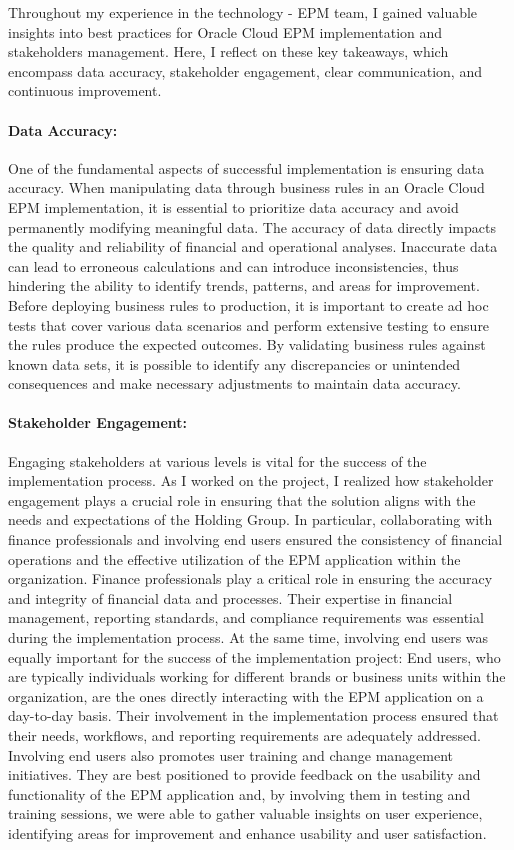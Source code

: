\documentclass[12pt,a4paper,openright,twoside]{book}
\begin{document}
Throughout my experience in the technology - EPM team, I gained valuable insights into best practices for Oracle Cloud EPM implementation and stakeholders management.
%
Here, I reflect on these key takeaways, which encompass data accuracy, stakeholder engagement, clear communication, and continuous improvement.

\paragraph{Data Accuracy:}
One of the fundamental aspects of successful implementation is ensuring data accuracy. 
%
When manipulating data through business rules in an Oracle Cloud EPM implementation, it is essential to prioritize data accuracy and avoid permanently modifying meaningful data. 
%
The accuracy of data directly impacts the quality and reliability of financial and operational analyses. 
%
Inaccurate data can lead to erroneous calculations and can introduce inconsistencies, thus hindering the ability to identify trends, patterns, and areas for improvement.
%
Before deploying business rules to production, it is important to create ad hoc tests that cover various data scenarios and perform extensive testing to ensure the rules produce the expected outcomes. 
%
By validating business rules against known data sets, it is possible to identify any discrepancies or unintended consequences and make necessary adjustments to maintain data accuracy.

\paragraph{Stakeholder Engagement:}
Engaging stakeholders at various levels is vital for the success of the implementation process. 
%
As I worked on the project, I realized how stakeholder engagement plays a crucial role in ensuring that the solution aligns with the needs and expectations of the Holding Group.
%
In particular, collaborating with finance professionals and involving end users ensured the consistency of financial operations and the effective utilization of the EPM application within the organization.
%
Finance professionals play a critical role in ensuring the accuracy and integrity of financial data and processes. 
%
Their expertise in financial management, reporting standards, and compliance requirements was essential during the implementation process.
%
At the same time, involving end users was equally important for the success of the implementation project:
%
End users, who are typically individuals working for different brands or business units within the organization, are the ones directly interacting with the EPM application on a day-to-day basis. 
%
Their involvement in the implementation process ensured that their needs, workflows, and reporting requirements are adequately addressed.
%
Involving end users also promotes user training and change management initiatives. 
%
They are best positioned to provide feedback on the usability and functionality of the EPM application and, by involving them in testing and training sessions, we were able to gather valuable insights on user experience, identifying areas for improvement and enhance usability and user satisfaction.
\end{document}
